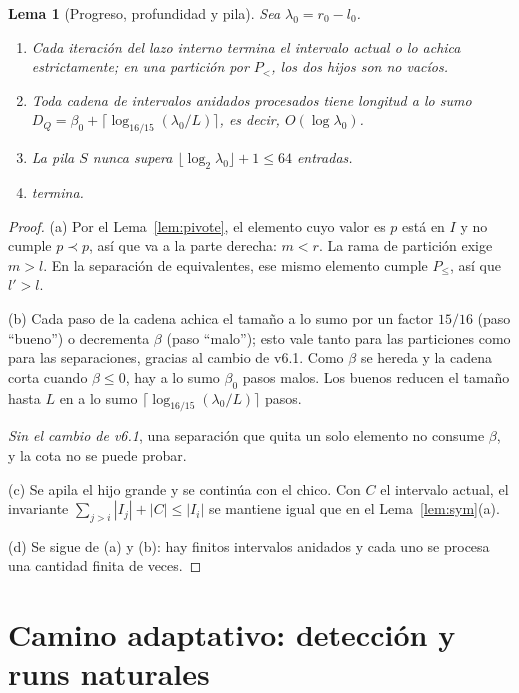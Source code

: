\documentclass[10pt,a4paper]{article}
\theoremstyle{plain}
\newtheorem{lema}[teorema]{Lema}
\theoremstyle{definition}
\theoremstyle{remark}
\newcommand{\lt}{\prec}
\newcommand{\leaf}{L}
\begin{document}
\begin{lema}[Progreso, profundidad y pila]\label{lem:prof}
Sea $\lambda_0=r_0-l_0$.
\begin{enumerate}[label=(\alph*),nosep]
\item Cada iteración del lazo interno termina el intervalo actual o lo achica
  estrictamente; en una partición por $P_<$, los dos hijos son no vacíos.
\item Toda cadena de intervalos anidados procesados tiene longitud a lo sumo
  $D_Q=\beta_0+\lceil\log_{16/15}(\lambda_0/\leaf)\rceil$, es decir, $O(\log\lambda_0)$.
\item La pila $S$ nunca supera $\lfloor\log_2\lambda_0\rfloor+1\le 64$ entradas.
\item \Quick termina.
\end{enumerate}
\end{lema}
\begin{proof}
(a) Por el Lema~\ref{lem:pivote}, el elemento cuyo valor es $p$ está en $I$ y no
cumple $p\lt p$, así que va a la parte derecha: $m<r$. La rama de partición exige
$m>l$. En la separación de equivalentes, ese mismo elemento cumple $P_\le$, así que
$l'>l$.

(b) Cada paso de la cadena achica el tamaño a lo sumo por un factor $15/16$ (paso
``bueno'') o decrementa $\beta$ (paso ``malo''); esto vale tanto para las particiones
como para las separaciones, gracias al cambio de v6.1. Como $\beta$ se hereda y la
cadena corta cuando $\beta\le 0$, hay a lo sumo $\beta_0$ pasos malos. Los buenos
reducen el tamaño hasta $\leaf$ en a lo sumo $\lceil\log_{16/15}(\lambda_0/\leaf)\rceil$
pasos.

\emph{Sin el cambio de v6.1}, una separación que quita un solo elemento no consume
$\beta$, y la cota no se puede probar.

(c) Se apila el hijo grande y se continúa con el chico. Con $C$ el intervalo actual,
el invariante $\sum_{j>i}|I_j|+|C|\le|I_i|$ se mantiene igual que en el
Lema~\ref{lem:sym}(a).

(d) Se sigue de (a) y (b): hay finitos intervalos anidados y cada uno se procesa una
cantidad finita de veces.
\end{proof}

\section{Camino adaptativo: detección y runs naturales}
\end{document}

